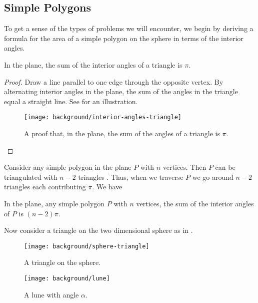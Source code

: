 \subsection{Simple Polygons}
\label{sec:warm-up}

To get a sense of the types of problems we will encounter,
we begin by deriving a formula for the area
of a simple polygon on the sphere in terms of the 
interior angles.
\begin{theorem}\label{thm:triangle}
In the plane, the sum of the interior angles of a triangle is $\pi$.
\end{theorem}
\begin{proof}
Draw a line parallel to one edge through the opposite vertex.
By alternating interior angles in the plane, the sum of the angles
in the triangle equal  a straight line.
See  for an illustration. 



\begin{figure}[htb]
\centering
\texttt{[image: background/interior-angles-triangle]}
\caption{A proof that, in the plane, the sum of the angles of a triangle is $\pi$.}
\label{fig:angles}
\end{figure}

\end{proof}



Consider any simple polygon in the plane $P$ with $n$ vertices. 
Then $P$ can be triangulated with $n-2$ triangles \cite{orourke_computational_1994}.
Thus, when we traverse $P$ we go around $n-2$ triangles each contributing
$\pi$.
We have
\begin{corollary}\label{cor:angles}
In the plane, any simple polygon $P$ with $n$ vertices,
the sum of the interior angles of $P$ is $(n-2)\pi$.

\end{corollary}

Now consider a triangle on the two dimensional sphere as in .

\begin{figure}[htb]
\centering
\texttt{[image: background/sphere-triangle]}
\caption{A triangle on the sphere.}
\label{fig:sphere-triangle}
\end{figure}


\begin{figure}[htb]
\centering
\texttt{[image: background/lune]}
\caption{A lune with angle $\alpha$.}
\label{fig:lune}
\end{figure}